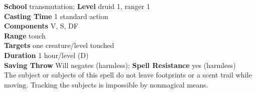 \textbf{School} transmutation; \textbf{Level} druid 1, ranger 1\\
\textbf{Casting Time} 1 standard action\\
\textbf{Components} V, S, DF\\
\textbf{Range} touch\\
\textbf{Targets} one creature/level touched\\
\textbf{Duration} 1 hour/level (D)\\
\textbf{Saving Throw }Will negates (harmless); \textbf{Spell Resistance} yes (harmless)\\
The subject or subjects of this spell do not leave footprints or a scent trail while moving. Tracking the subjects is impossible by nonmagical means.\\
